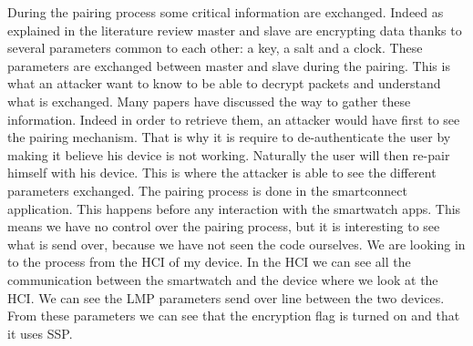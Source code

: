 During the pairing process some critical information are exchanged. Indeed as explained in the literature review master and slave are encrypting data thanks to several parameters common to each other: a key, a salt and a clock. These parameters are exchanged between master and slave during the pairing. This is what an attacker want to know to be able to decrypt packets and understand what is exchanged.
Many papers have discussed the way to gather these information. Indeed in order to retrieve them, an attacker would have first to see the pairing mechanism. That is why it is require to de-authenticate the user by making it believe his device is not working. Naturally the user will then re-pair himself with his device. This is where the attacker is able to see the different parameters exchanged. 
The pairing process is done in the smartconnect application. This happens before any interaction with the smartwatch apps. This means we have no control over the pairing process, but it is interesting to see what is send over, because we have not seen the code ourselves. 
We are looking in to the process from the HCI of my device. In the HCI we can see all the communication between the smartwatch and the device where we look at the HCI. We can see the LMP parameters send over line between the two devices. From these parameters we can see that the encryption flag is turned on and that it uses SSP.